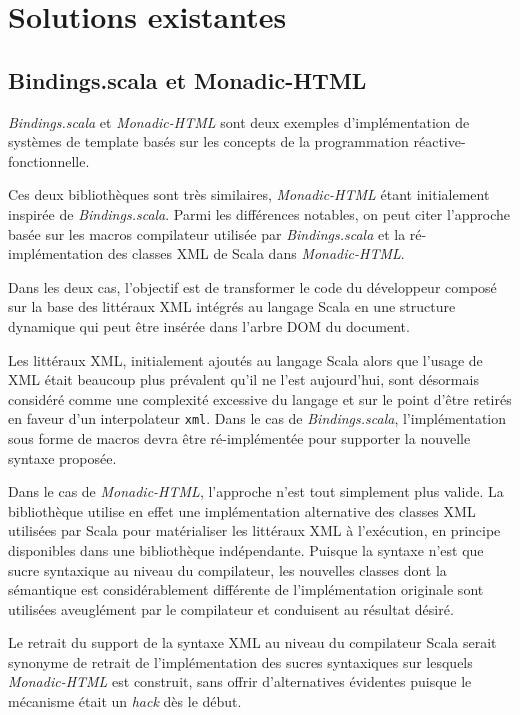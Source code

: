 \section{Solutions existantes}

\subsection{Bindings.scala et Monadic-HTML}

\emph{Bindings.scala} \cite{binding.scala} et \emph{Monadic-HTML} \cite{monadic-html} sont deux exemples d'implémentation de systèmes de template basés sur les concepts de la programmation réactive-fonctionnelle.

Ces deux bibliothèques sont très similaires, \emph{Monadic-HTML} étant initialement inspirée de \emph{Bindings.scala}. Parmi les différences notables, on peut citer l'approche basée sur les macros compilateur utilisée par \emph{Bindings.scala} et la ré-implémentation des classes XML de Scala dans \emph{Monadic-HTML}.

Dans les deux cas, l'objectif est de transformer le code du développeur composé sur la base des littéraux XML intégrés au langage Scala en une structure dynamique qui peut être insérée dans l'arbre DOM du document.

Les littéraux XML, initialement ajoutés au langage Scala alors que l'usage de XML était beaucoup plus prévalent qu'il ne l'est aujourd'hui, sont désormais considéré comme une complexité excessive du langage et sur le point d'être retirés en faveur d'un interpolateur \texttt{xml}. Dans le cas de \emph{Bindings.scala}, l'implémentation sous forme de macros devra être ré-implémentée pour supporter la nouvelle syntaxe proposée.

Dans le cas de \emph{Monadic-HTML}, l'approche n'est tout simplement plus valide. La bibliothèque utilise en effet une implémentation alternative des classes XML utilisées par Scala pour matérialiser les littéraux XML à l'exécution, en principe disponibles dans une bibliothèque indépendante. Puisque la syntaxe n'est que sucre syntaxique au niveau du compilateur, les nouvelles classes dont la sémantique est considérablement différente de l'implémentation originale sont utilisées aveuglément par le compilateur et conduisent au résultat désiré.

Le retrait du support de la syntaxe XML au niveau du compilateur Scala serait synonyme de retrait de l'implémentation des sucres syntaxiques sur lesquels  \emph{Monadic-HTML} est construit, sans offrir d'alternatives évidentes puisque le mécanisme était un \emph{hack} dès le début.

